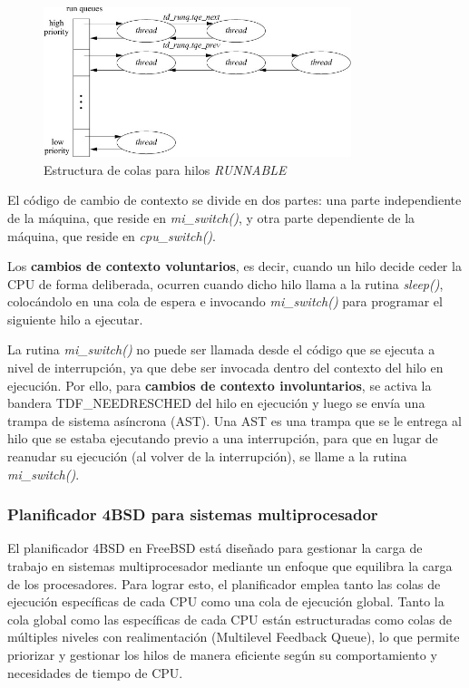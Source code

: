 \begin{figure}[H]
    \centering
    \vspace*{0.2in}
    \includegraphics[width=0.8\textwidth]{./images/queueing-structure.jpg}
    \caption{Estructura de colas para hilos \textit{RUNNABLE}}
    \label{fig:queueing-structure}
\end{figure}

El código de cambio de contexto se divide en dos partes: una parte independiente de la máquina, que reside en \textit{mi\_switch()}, y otra parte dependiente de la máquina, que reside en \textit{cpu\_switch()}.\par

Los \textbf{cambios de contexto voluntarios}, es decir, cuando un hilo decide ceder la CPU de forma deliberada, ocurren cuando dicho hilo llama a la rutina \textit{sleep()}, colocándolo en una cola de espera e invocando \textit{mi\_switch()} para programar el siguiente hilo a ejecutar.\par

La rutina \textit{mi\_switch()} no puede ser llamada desde el código que se ejecuta a nivel de interrupción, ya que debe ser invocada dentro del contexto del hilo en ejecución. Por ello, para \textbf{cambios de contexto involuntarios}, se activa la bandera TDF\_NEEDRESCHED del hilo en ejecución y luego se envía una trampa de sistema asíncrona (AST). Una AST es una trampa que se le entrega al hilo que se estaba ejecutando previo a una interrupción, para que en lugar de reanudar su ejecución (al volver de la interrupción), se llame a la rutina \textit{mi\_switch()}.\par

\subsubsection{Planificador 4BSD para sistemas multiprocesador}

El planificador 4BSD en FreeBSD está diseñado para gestionar la carga de trabajo en sistemas multiprocesador mediante un enfoque que equilibra la carga de los procesadores. Para lograr esto, el planificador emplea tanto las colas de ejecución específicas de cada CPU como una cola de ejecución global. Tanto la cola global como las específicas de cada CPU están estructuradas como colas de múltiples niveles con realimentación (Multilevel Feedback Queue), lo que permite priorizar y gestionar los hilos de manera eficiente según su comportamiento y necesidades de tiempo de CPU.


